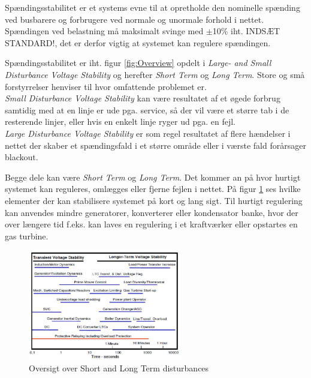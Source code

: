 
\label{Spaendingsstabilitet}

Spændingsstabilitet er et systems evne til at opretholde den nominelle spænding ved busbarere og forbrugere ved normale og unormale forhold i nettet. Spændingen ved belastning må maksimalt svinge med $\pm$10\% iht. INDSÆT STANDARD!, det er derfor vigtig at systemet kan regulere spændingen.  

Spændingsstabilitet er iht. figur \ref{fig:Overview} opdelt i \textit{Large- and Small Disturbance Voltage Stability} og herefter \textit{Short Term} og \textit{Long Term}. Store og små forstyrrelser henviser til hvor omfattende problemet er. \\
\textit{Small Disturbance Voltage Stability} kan være resultatet af et øgede forbrug samtidig med at en linje er ude pga. service, så der vil være et større tab i de resterende linjer, eller hvis en enkelt linje ryger ud pga. en fejl.\\
\textit{Large Disturbance Voltage Stability} er som regel resultatet af flere hændelser i nettet der skaber et spændingsfald i et større område eller i værste fald forårsager blackout.

Begge dele kan være \textit{Short Term} og \textit{Long Term}. Det kommer an på hvor hurtigt systemet kan reguleres, omlægges eller fjerne fejlen i nettet. På figur \ref{fig:VoltageTime} ses hvilke elementer der kan stabilisere systemet på kort og lang sigt. Til hurtigt regulering kan anvendes mindre generatorer, konverterer eller kondensator banke, hvor der over længere tid f.eks. kan laves en regulering i et kraftværker eller opstartes en gas turbine.  

\begin{figure}[H] %
	\centering
	\includegraphics[width=0.6\textwidth]{figurer/Voltage_time}
	\caption{Oversigt over Short and Long Term disturbances}
	\label{fig:VoltageTime}
\end{figure}

